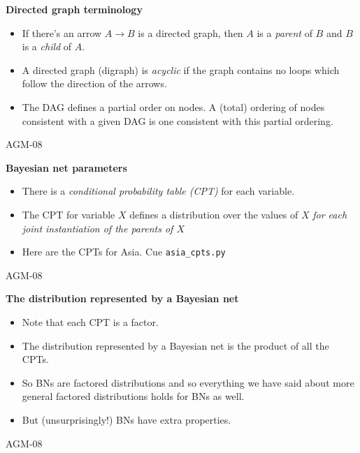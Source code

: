 \documentclass[landscape]{slides}
\newcommand{\lecnum}{AGM-08}
\newcommand{\slidehead}[1]{{\centering \bf #1 \\}}
\newenvironment{titledslide}[1]{\begin{slide}\slidehead{#1}\vfill}{\vfill \tiny \lecnum \end{slide}}
\begin{document}
\begin{titledslide}{Directed graph terminology}
  
  \begin{itemize}
  \item If there's an arrow $A \rightarrow B$ is a directed graph,
    then $A$ is a \emph{parent} of $B$ and $B$ is a \emph{child} of $A$.
  \item A directed graph (digraph) is \emph{acyclic} if the graph
    contains no loops which follow the direction of the arrows.
  \item The DAG defines a partial order on nodes. A (total) ordering
    of nodes consistent with a given DAG is one consistent with this
    partial ordering.
  \end{itemize}

\end{titledslide}
\begin{titledslide}{Bayesian net parameters}
  
  \begin{itemize}
  \item There is a \emph{conditional probability table (CPT)} for each
    variable.
  \item The CPT for variable $X$ defines a distribution over the
    values of $X$ \emph{for each joint instantiation of the parents of
      $X$}
  \item Here are the CPTs for Asia. Cue \verb+asia_cpts.py+
  \end{itemize}


\end{titledslide}
\begin{titledslide}{The distribution represented by a Bayesian net}

  \begin{itemize}
  \item Note that each CPT is a factor.
  \item The distribution represented by a Bayesian net is the product
    of all the CPTs.
  \item So BNs are factored distributions and so everything we have
    said about more general factored distributions holds for BNs as well.
  \item But (unsurprisingly!) BNs have extra properties.
  \end{itemize}
  
\end{titledslide}
\end{document}
